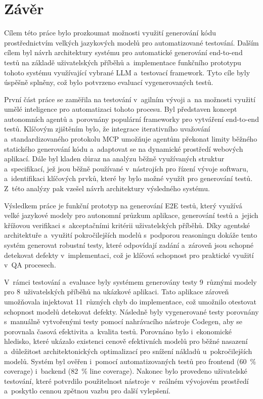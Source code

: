 \documentclass[czech, ing, kiv, he, iso690numb, viewonly]{fasthesis}
\begin{document}
\chapter{Závěr}\label{chapter:end}
Cílem této práce bylo prozkoumat možnosti využití generování kódu prostřednictvím velkých jazykových modelů 
pro automatizované testování. Dalším cílem byl návrh architektury systému pro automatické 
generování end-to-end testů na základě uživatelských příběhů a~implementace funkčního prototypu tohoto systému
využívající vybrané LLM a~testovací framework. Tyto cíle byly úspěšně splněny, 
což bylo potvrzeno evaluací vygenerovaných testů.
\newline

První část práce se zaměřila na testování v~agilním vývoji a~na možnosti využití umělé inteligence pro automatizaci tohoto procesu.
Byl představen koncept autonomních agentů a~porovnány populární frameworky pro vytváření end-to-end testů. 
Klíčovým zjištěním bylo, že integrace iterativního uvažování a~standardizovaného protokolu MCP umožňuje agentům překonat limity běžného
statického generování kódu a~adaptovat se na dynamické prostředí webových aplikací.
Dále byl kladen důraz na analýzu běžně využívaných struktur a~specifikací, jež jsou 
běžně používané v~nástrojích pro řízení vývoje softwaru, a~identifikaci klíčových prvků,
které by bylo možné využít pro generování testů.
Z~této analýzy pak vzešel návrh architektury výsledného systému. 
\newline

Výsledkem práce je funkční prototyp na generování E2E testů, který využívá velké jazykové modely pro autonomní průzkum aplikace,
generování testů a~jejich křížovou verifikaci s~akceptačními kritérii uživatelských příběhů.
Díky agentské architektuře a~využití pokročilejších modelů s~podporou reasoningu dokáže 
tento systém generovat robustní testy, které odpovídají zadání a~zároveň jsou schopné detekovat 
defekty v~implementaci, což je klíčová schopnost pro praktické využití v~QA procesech.
\newline

V~rámci testování a~evaluace byly systémem generovány testy 9~různými modely
pro 8~uživatelských příběhů na ukázkové aplikaci. Tato aplikace zároveň
umožňovala injektovat 11~různých chyb do implementace, 
což umožnilo otestovat schopnost modelů detekovat defekty.
Následně byly vygenerované testy porovnány s~manuálně vytvořenými testy pomocí nahrávacího nástroje Codegen,
aby se porovnala časová efektivita a~kvalita testů. 
Porovnáno bylo i~ekonomické hledisko, které ukázalo existenci
cenově efektivních modelů pro běžné nasazení a~důležitost architektonických optimalizací 
pro snížení nákladů u~pokročilejších modelů.
Systém byl ověřen i~pomocí automatizovaných testů pro frontend (60~\% coverage) i~backend (82~\% line coverage).
Nakonec bylo provedeno uživatelské testování, které potvrdilo použitelnost nástroje v~reálném vývojovém prostředí 
a~poskytlo cennou zpětnou vazbu pro další vylepšení.
\newline
\end{document}
